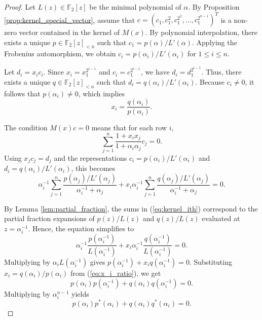\documentclass[hidelinks,onefignum,onetabnum]{siamart251216}
\theoremstyle{definition}
\theoremstyle{remark}
\begin{document}
\begin{proof}
	Let $L(z) \in \mathbb{F}_2[z]$ be the minimal polynomial of $\alpha$. By Proposition \ref{prop:kernel_special_vector}, assume that $c = \left(c_1, c_1^2, c_1^{2^2}, \dots, c_1^{2^{n-1}}\right)^T$ is a non-zero vector contained in the kernel of $M(x)$. By polynomial interpolation, there exists a unique $p \in \mathbb{F}_2[z]_{<n}$ such that $c_1 = p(\alpha)/L'(\alpha)$. Applying the Frobenius automorphism, we obtain $c_i = p(\alpha_i)/L'(\alpha_i)$ for $1 \le i \le n$. 
	
	Let $d_i = x_i c_i$. Since $x_i = x_1^{2^{i-1}}$ and $c_i = c_1^{2^{i-1}}$, we have $d_i = d_1^{2^{i-1}}$. Thus, there exists a unique $q \in \mathbb{F}_2[z]_{<n}$ such that $d_i = q(\alpha_i)/L'(\alpha_i)$. Because $c_{i}\ne 0$, it follows that $p(\alpha_i) \neq 0$, which implies
	\begin{equation}
		\label{eq:x_i_ratio}
		x_i = \frac{q(\alpha_i)}{p(\alpha_i)}.
	\end{equation}
	
	The condition $M(x)c = 0$ means that for each row $i$,
	\[
	\sum_{j=1}^n \frac{1+x_i x_j}{1+\alpha_i \alpha_j} c_j = 0.
	\]
	Using $x_j c_j = d_j$ and the representations $c_i = p(\alpha_i)/L'(\alpha_i)$ and $d_i = q(\alpha_i)/L'(\alpha_i)$, this becomes
	\begin{equation}
		\label{eq:kernel_ith}
		\alpha_i^{-1} \sum_{j=1}^n \frac{p(\alpha_j)/L'(\alpha_j)}{\alpha_i^{-1} + \alpha_j} + x_i \alpha_i^{-1} \sum_{j=1}^n \frac{q(\alpha_j)/L'(\alpha_j)}{\alpha_i^{-1} + \alpha_j} = 0.
	\end{equation}
	
	By Lemma \ref{lem:partial_fraction}, the sums in (\ref{eq:kernel_ith}) correspond to the partial fraction expansions of $p(z)/L(z)$ and $q(z)/L(z)$ evaluated at $z = \alpha_i^{-1}$. Hence, the equation simplifies to
	\[
	\alpha_i^{-1} \frac{p(\alpha_i^{-1})}{L(\alpha_i^{-1})} + x_i \alpha_i^{-1} \frac{q(\alpha_i^{-1})}{L(\alpha_i^{-1})} = 0.
	\]
	Multiplying by $\alpha_i L(\alpha_i^{-1})$ gives $p(\alpha_i^{-1}) + x_i q(\alpha_i^{-1}) = 0$. Substituting $x_i = q(\alpha_i)/p(\alpha_i)$ from (\ref{eq:x_i_ratio}), we get
	\[
	p(\alpha_i)p(\alpha_i^{-1}) + q(\alpha_i)q(\alpha_i^{-1}) = 0.
	\]
	Multiplying by $\alpha_i^{n-1}$ yields
	\[
	p(\alpha_i)p^*(\alpha_i) + q(\alpha_i)q^*(\alpha_i) = 0.
	\]
	

\end{proof}
\end{document}
